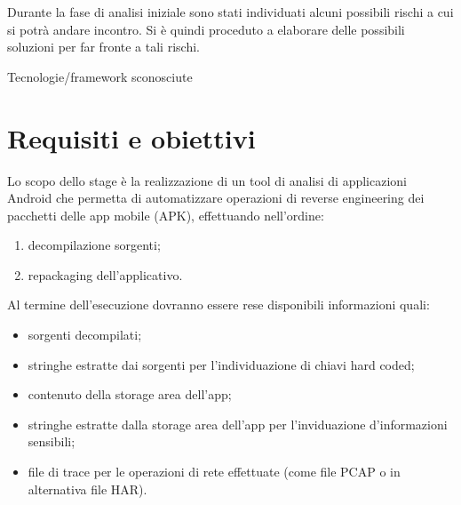 Durante la fase di analisi iniziale sono stati individuati alcuni possibili rischi a cui si potrà andare incontro.
Si è quindi proceduto a elaborare delle possibili soluzioni per far fronte a tali rischi.\\

\begin{risk}{Tecnologie/framework sconosciute}
    \label{risk:tecnologie-framework-sconosciute}
\end{risk}

\section{Requisiti e obiettivi}\label{sec:requisiti-e-obiettivi}
Lo scopo dello stage è la realizzazione di un tool di analisi di applicazioni Android che permetta di automatizzare operazioni di reverse engineering dei pacchetti delle app mobile (APK), effettuando nell'ordine:
\begin{enumerate}
    \setlength\itemsep{0.1em}
    \item decompilazione sorgenti;
    \item repackaging dell'applicativo.
\end{enumerate}

Al termine dell'esecuzione dovranno essere rese disponibili informazioni quali:
\begin{itemize}
    \setlength\itemsep{0.1em}
    \item sorgenti decompilati;
    \item stringhe estratte dai sorgenti per l'individuazione di chiavi hard coded;
    \item contenuto della storage area dell'app;
    \item stringhe estratte dalla storage area dell'app per l'inviduazione d'informazioni sensibili;
    \item file di trace per le operazioni di rete effettuate (come file PCAP o in alternativa file HAR).
\end{itemize}

